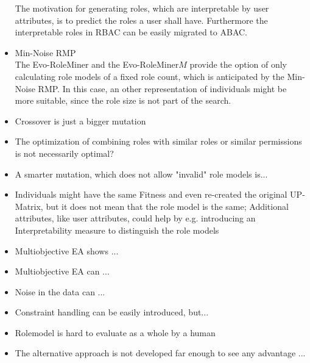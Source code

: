 \begin{itemize}
	The motivation for generating roles, which are interpretable by user attributes, is to predict the roles a user shall have. Furthermore the interpretable roles in RBAC can be easily migrated to ABAC.
	
	\item Min-Noise RMP\\
	The Evo-RoleMiner and the Evo-RoleMiner$M$ provide the option of only calculating role models of a fixed role count, which is anticipated by the Min-Noise RMP. In this case, an other representation of individuals might be more suitable, since the role size is not part of the search.
	
	
	\item Crossover is just a bigger mutation
	\item The optimization of combining roles with similar roles or similar permissions is not necessarily optimal?
	\item A smarter mutation, which does not allow "invalid" role models is...
	
	
	\item Individuals might have the same Fitness and even re-created the original UP-Matrix, but it does not mean that the role model is the same; Additional attributes, like user attributes, could help by e.g. introducing an Interpretability measure to distinguish the role models
	
	\item Multiobjective EA shows ...
	\item Multiobjective EA can ...
	\item Noise in the data can ...
	\item Constraint handling can be easily introduced, but...
	\item Rolemodel is hard to evaluate as a whole by a human
	\item The alternative approach is not developed far enough to see any advantage ...
\end{itemize}
